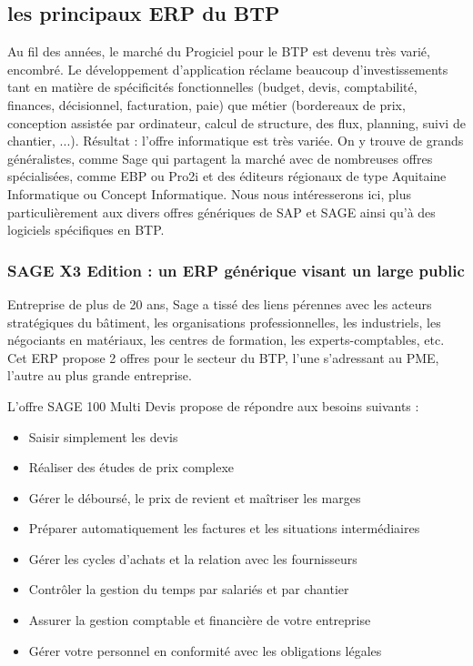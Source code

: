 		\subsection{les principaux ERP du BTP}
		Au fil des années, le marché du Progiciel pour le BTP est devenu très varié, encombré. 
Le développement d'application réclame beaucoup d'investissements tant en matière de spécificités fonctionnelles (budget, devis, comptabilité, finances, décisionnel, facturation, paie) que métier (bordereaux de prix, conception assistée par ordinateur, calcul de structure, des flux, planning, suivi de chantier, ...). 
Résultat : l'offre informatique est très variée. On y trouve de grands généralistes, comme Sage qui partagent la marché avec de nombreuses offres spécialisées, comme EBP ou Pro2i et des éditeurs régionaux de type Aquitaine Informatique ou Concept Informatique.
Nous nous intéresserons ici, plus particulièrement aux divers offres génériques de SAP et SAGE ainsi qu'à des logiciels spécifiques en BTP.
				\subsubsection{SAGE X3 Edition : un ERP générique visant un large public}

						
Entreprise de plus de 20 ans, Sage a tissé des liens pérennes avec les acteurs stratégiques du bâtiment, les organisations professionnelles, les industriels, les négociants en matériaux, les centres de formation, les experts-comptables, etc. 
Cet ERP propose 2 offres pour le secteur du BTP, l'une s'adressant au PME, l'autre au plus grande entreprise.

L'offre SAGE 100 Multi Devis propose de répondre aux besoins suivants :
\begin{itemize}
    \item Saisir simplement les devis
    \item Réaliser des études de prix complexe
    \item Gérer le déboursé, le prix de revient et maîtriser les marges
    \item Préparer automatiquement les factures et les situations intermédiaires
    \item Gérer les cycles d’achats et la relation avec les fournisseurs
    \item Contrôler la gestion du temps par salariés et par chantier
    \item Assurer la gestion comptable et financière de votre entreprise
    \item Gérer votre personnel en conformité avec les obligations légales\\
\end{itemize}

